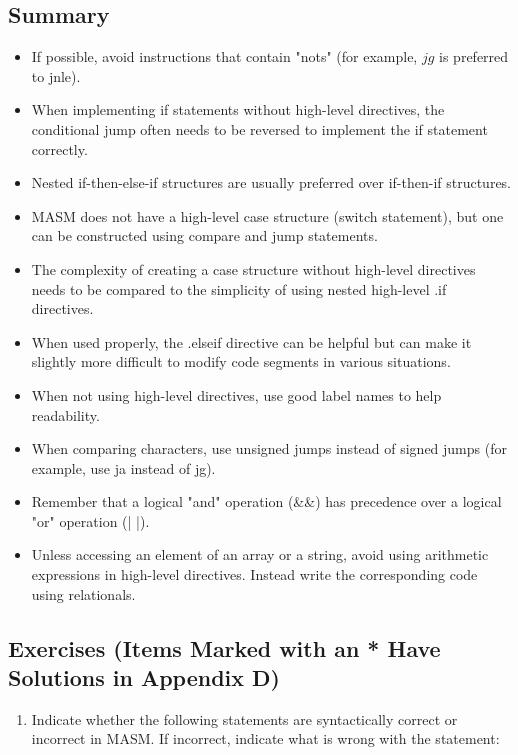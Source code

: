 \documentclass[10pt]{book}
\begin{document}
\subsection{Summary}
\begin{itemize}
  \item If possible, avoid instructions that contain "nots" (for example, $j g$ is preferred to jnle).
  \item When implementing if statements without high-level directives, the conditional jump often needs to be reversed to implement the if statement correctly.
  \item Nested if-then-else-if structures are usually preferred over if-then-if structures.
  \item MASM does not have a high-level case structure (switch statement), but one can be constructed using compare and jump statements.
  \item The complexity of creating a case structure without high-level directives needs to be compared to the simplicity of using nested high-level .if directives.
  \item When used properly, the .elseif directive can be helpful but can make it slightly more difficult to modify code segments in various situations.
  \item When not using high-level directives, use good label names to help readability.
  \item When comparing characters, use unsigned jumps instead of signed jumps (for example, use ja instead of jg).
  \item Remember that a logical "and" operation (\&\&) has precedence over a logical "or" operation (| |).
  \item Unless accessing an element of an array or a string, avoid using arithmetic expressions in high-level directives. Instead write the corresponding code using relationals.
\end{itemize}


\subsection{Exercises (Items Marked with an * Have Solutions in Appendix D)}
\begin{enumerate}
  \item Indicate whether the following statements are syntactically correct or incorrect in MASM. If incorrect, indicate what is wrong with the statement:
\end{enumerate}
\end{document}
